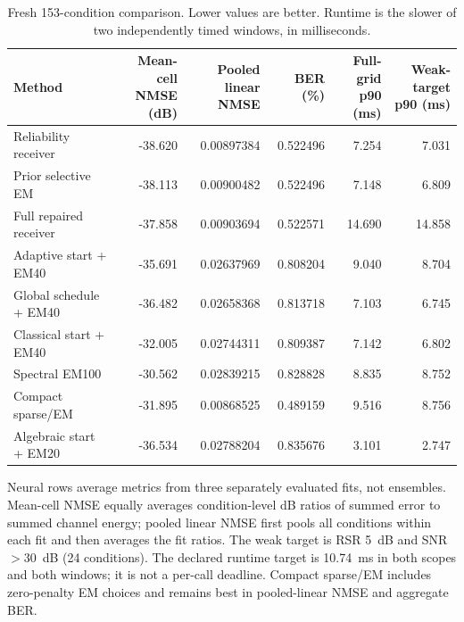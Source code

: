\begin{table}[!t]
\centering
\caption{Fresh 153-condition comparison. Lower values are better. Runtime is the slower of two independently timed windows, in milliseconds.}
\label{tab:reliability-main}
\small
\setlength{\tabcolsep}{4pt}
\begin{tabular}{lrrrrr}
\toprule
Method & \shortstack{Mean-cell\\NMSE (dB)} & \shortstack{Pooled linear\\NMSE} & BER (\%) & \shortstack{Full-grid\\p90 (ms)} & \shortstack{Weak-target\\p90 (ms)} \\
\midrule
Reliability receiver & -38.620 & 0.00897384 & 0.522496 & 7.254 & 7.031 \\
Prior selective EM & -38.113 & 0.00900482 & 0.522496 & 7.148 & 6.809 \\
Full repaired receiver & -37.858 & 0.00903694 & 0.522571 & 14.690 & 14.858 \\
Adaptive start + EM40 & -35.691 & 0.02637969 & 0.808204 & 9.040 & 8.704 \\
Global schedule + EM40 & -36.482 & 0.02658368 & 0.813718 & 7.103 & 6.745 \\
Classical start + EM40 & -32.005 & 0.02744311 & 0.809387 & 7.142 & 6.802 \\
Spectral EM100 & -30.562 & 0.02839215 & 0.828828 & 8.835 & 8.752 \\
Compact sparse/EM & -31.895 & 0.00868525 & 0.489159 & 9.516 & 8.756 \\
Algebraic start + EM20 & -36.534 & 0.02788204 & 0.835676 & 3.101 & 2.747 \\
\bottomrule
\end{tabular}
\par\vspace{2pt}
\begin{minipage}{0.98\textwidth}\footnotesize Neural rows average metrics from three separately evaluated fits, not ensembles. Mean-cell NMSE equally averages condition-level dB ratios of summed error to summed channel energy; pooled linear NMSE first pools all conditions within each fit and then averages the fit ratios. The weak target is RSR 5~dB and SNR $>30$~dB (24 conditions). The declared runtime target is 10.74~ms in both scopes and both windows; it is not a per-call deadline. Compact sparse/EM includes zero-penalty EM choices and remains best in pooled-linear NMSE and aggregate BER.\end{minipage}
\end{table}
